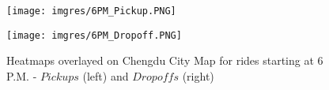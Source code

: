 \documentclass[11pt]{article}
\begin{document}


\begin{figure}
    \centering
    \begin{minipage}{0.45\textwidth}
        \centering
        \texttt{[image: imgres/6PM\_Pickup.PNG]} %
    \end{minipage}\hfill
    \begin{minipage}{0.45\textwidth}
        \centering
        \texttt{[image: imgres/6PM\_Dropoff.PNG]} %
    \end{minipage}
    \caption{Heatmaps overlayed on Chengdu City Map for rides starting at 6 P.M. -  $Pickups$ (left) and $\mathit{Dropoffs}$ (right) }
    \label{fig:heatmaps6pm}
\end{figure}
\end{document}
